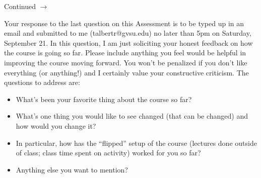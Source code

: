 \documentclass[addpoints]{exam}
\def\pageturn{\vfill
\begin{flushright}
	\begin{small}
		Continued $\rightarrow$
	\end{small}
\end{flushright}
\newpage}
\begin{document}
\begin{questions}

\pageturn

\question[6] Your response to the last question on this Assessment is to be typed up in an email and submitted to me (talbertr@gvsu.edu) no later than 5pm on Saturday, September 21. In this question, I am just soliciting your honest feedback on how the course is going so far. Please include anything you feel would be helpful in improving the course moving forward. You won't be penalized if you don't like everything (or anything!) and I certainly value your constructive criticism. The questions to address are: 
\begin{itemize}
	\item What's been your favorite thing about the course so far? 
	\item What's one thing you would like to see changed (that can be changed) and how would you change it? 
	\item In particular, how has the ``flipped'' setup of the course (lectures done outside of class; class time spent on activity) worked for you so far? 
	\item Anything else you want to mention? 
\end{itemize}

\end{questions}
\end{document}

